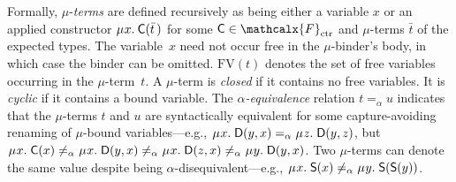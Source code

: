 \documentclass[letter]{article}
\newcommand\MU{\vvthinspace\mu\vvthinspace}
\theoremstyle{plain}
\theoremstyle{definition}
\newcommand\FV{\mathrm{FV}}
\newcommand\const[1]{\textsf{#1}}
\renewcommand{\vec}[1]{\bar #1}
\newcommand{\rn}[1]{\textsf{#1}}
\newcommand{\aequiv}{\mathrel{=_\alpha}}
\newcommand\Types{\mathcalx{Y}}
\newcommand\Funcs{\mathcalx{F}}
\newcommand\Codata{\Types_{\mathrm{codt}}}
\newcommand\Nondata{\Types_{\mathrm{ord}}}
\newcommand\Ctr{\Funcs_{\smash{\mathrm{ctr}}}}
\newcommand\vvthinspace{\kern+0.041667em}
\begin{document}
Formally, $\mu$-\emph{terms} are defined recursively as being either a variable $x$
or an applied constructor
$\MU x.\: \const{C}( \vec t\, )$ for some $\const{C} \in \Ctr$ and
$\mu$-terms $\vec t$ of the expected types.
The variable~$x$ need not occur free in the $\mu$-binder's body, in which case
the binder can be omitted.
$\FV( t )$ denotes the set of free variables occurring in the $\mu$-term~$t$.
A $\mu$-term is \emph{closed} if %
it contains no free variables. It is \emph{cyclic} if %
it contains a bound variable. The $\alpha$\emph{-equiv\-alence} relation $t \aequiv u$
indicates that the $\mu$-terms $t$ and $u$
are syntactically equivalent for some capture-avoiding renaming of $\mu$-bound variables---e.g.,
$\MU x.\; \const{D}( y, x ) \aequiv \MU z.\; \const{D}( y, z )$,
but
$\MU x.\; \const{C}( x ) \not\aequiv \MU x.\; \const{D}( y, x ) \not\aequiv \MU x.\; \const{D}( z, x )
\not\aequiv \MU y.\; \const{D}( y, x )$.
Two $\mu$-terms can denote the same value despite being $\alpha$-disequivalent---e.g.,
$\MU x.\; \const{S}( x ) \not\aequiv \MU y.\; \const{S}( \const{S}( y ) )$.


%
%
%
\end{document}
